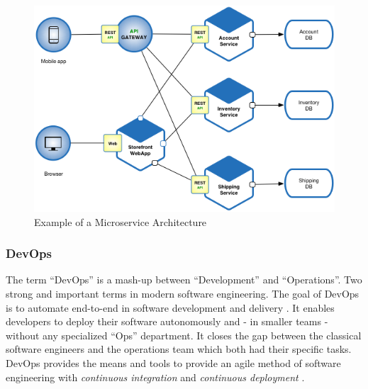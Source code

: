 \begin{figure}[h]
    \centering
    \includegraphics[width=\columnwidth]{images/Microservice_Architecture.png}
    \caption{Example of a Microservice Architecture}
\end{figure}

\subsubsection{DevOps}

The term ``DevOps'' is a mash-up between ``Development'' and ``Operations''. Two
strong and important terms in modern software engineering. The goal of DevOps is to
automate end-to-end in software development and delivery \cite{ebert:DevOps}. It enables
developers to deploy their software autonomously and - in smaller teams - without
any specialized ``Ops'' department. It closes the gap between the classical
software engineers and the operations team which both had their specific tasks. DevOps
provides the means and tools to provide an agile method of software engineering with
\textit{continuous integration} and \textit{continuous deployment} \cite{huettermann:DevOps}.
